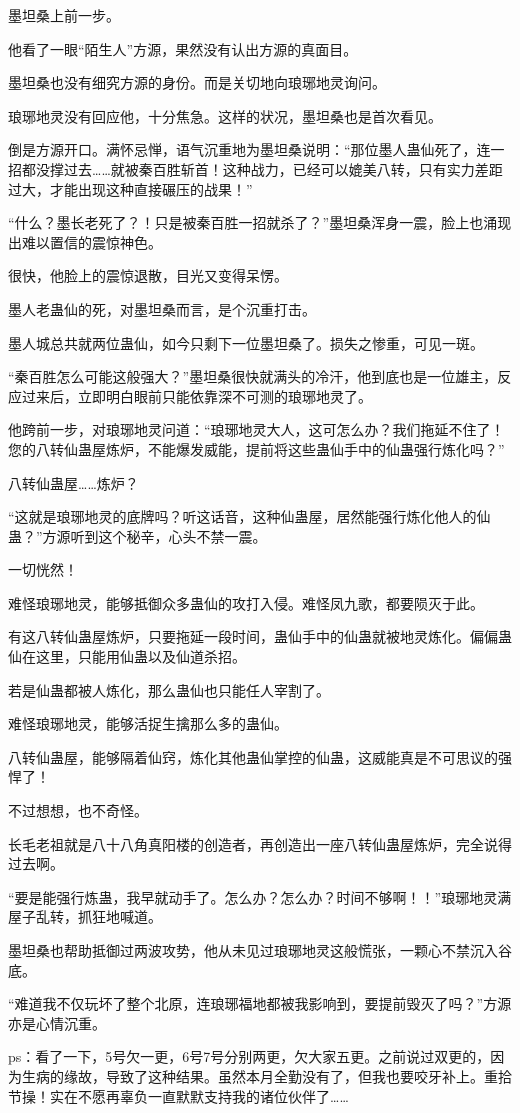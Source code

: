 \begin{this_body}
墨坦桑上前一步。

他看了一眼“陌生人”方源，果然没有认出方源的真面目。

墨坦桑也没有细究方源的身份。而是关切地向琅琊地灵询问。

琅琊地灵没有回应他，十分焦急。这样的状况，墨坦桑也是首次看见。

倒是方源开口。满怀忌惮，语气沉重地为墨坦桑说明：“那位墨人蛊仙死了，连一招都没撑过去……就被秦百胜斩首！这种战力，已经可以媲美八转，只有实力差距过大，才能出现这种直接碾压的战果！”

“什么？墨长老死了？！只是被秦百胜一招就杀了？”墨坦桑浑身一震，脸上也涌现出难以置信的震惊神色。

很快，他脸上的震惊退散，目光又变得呆愣。

墨人老蛊仙的死，对墨坦桑而言，是个沉重打击。

墨人城总共就两位蛊仙，如今只剩下一位墨坦桑了。损失之惨重，可见一斑。

“秦百胜怎么可能这般强大？”墨坦桑很快就满头的冷汗，他到底也是一位雄主，反应过来后，立即明白眼前只能依靠深不可测的琅琊地灵了。

他跨前一步，对琅琊地灵问道：“琅琊地灵大人，这可怎么办？我们拖延不住了！您的八转仙蛊屋炼炉，不能爆发威能，提前将这些蛊仙手中的仙蛊强行炼化吗？”

八转仙蛊屋……炼炉？

“这就是琅琊地灵的底牌吗？听这话音，这种仙蛊屋，居然能强行炼化他人的仙蛊？”方源听到这个秘辛，心头不禁一震。

一切恍然！

难怪琅琊地灵，能够抵御众多蛊仙的攻打入侵。难怪凤九歌，都要陨灭于此。

有这八转仙蛊屋炼炉，只要拖延一段时间，蛊仙手中的仙蛊就被地灵炼化。偏偏蛊仙在这里，只能用仙蛊以及仙道杀招。

若是仙蛊都被人炼化，那么蛊仙也只能任人宰割了。

难怪琅琊地灵，能够活捉生擒那么多的蛊仙。

八转仙蛊屋，能够隔着仙窍，炼化其他蛊仙掌控的仙蛊，这威能真是不可思议的强悍了！

不过想想，也不奇怪。

长毛老祖就是八十八角真阳楼的创造者，再创造出一座八转仙蛊屋炼炉，完全说得过去啊。

“要是能强行炼蛊，我早就动手了。怎么办？怎么办？时间不够啊！！”琅琊地灵满屋子乱转，抓狂地喊道。

墨坦桑也帮助抵御过两波攻势，他从未见过琅琊地灵这般慌张，一颗心不禁沉入谷底。

“难道我不仅玩坏了整个北原，连琅琊福地都被我影响到，要提前毁灭了吗？”方源亦是心情沉重。

ps：看了一下，5号欠一更，6号7号分别两更，欠大家五更。之前说过双更的，因为生病的缘故，导致了这种结果。虽然本月全勤没有了，但我也要咬牙补上。重拾节操！实在不愿再辜负一直默默支持我的诸位伙伴了……

\end{this_body}

